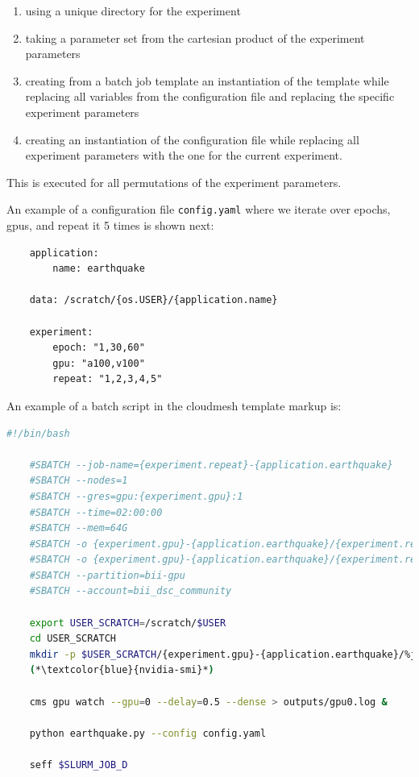\documentclass[utf8]{FrontiersinVancouver} %
\begin{document}
\begin{enumerate}
  \item using a unique directory for the experiment
  \item taking a parameter set from the cartesian product of the experiment parameters
  \item creating from a batch job template an instantiation of the template while replacing all variables from the configuration file    and replacing the specific experiment parameters
  \item creating an instantiation of the configuration file while replacing all experiment parameters with the one for the current experiment.
\end{enumerate}

This is executed for all permutations of the experiment parameters.

An example of a configuration file \verb|config.yaml| where we iterate over epochs, gpus, and repeat it 5 times is shown next:

\begin{lstlisting}
    application:
        name: earthquake

    data: /scratch/{os.USER}/{application.name}
       
    experiment:
        epoch: "1,30,60"
        gpu: "a100,v100"
        repeat: "1,2,3,4,5"
\end{lstlisting}

An example of a batch script in the cloudmesh template markup  is:

\begin{lstlisting}[language=sh]
    #!/bin/bash

    #SBATCH --job-name={experiment.repeat}-{application.earthquake}
    #SBATCH --nodes=1
    #SBATCH --gres=gpu:{experiment.gpu}:1
    #SBATCH --time=02:00:00
    #SBATCH --mem=64G
    #SBATCH -o {experiment.gpu}-{application.earthquake}/{experiment.repeat}-%j.out
    #SBATCH -o {experiment.gpu}-{application.earthquake}/{experiment.repeat}-%j.err
    #SBATCH --partition=bii-gpu
    #SBATCH --account=bii_dsc_community

    export USER_SCRATCH=/scratch/$USER
    cd USER_SCRATCH
    mkdir -p $USER_SCRATCH/{experiment.gpu}-{application.earthquake}/%j.out
    (*\textcolor{blue}{nvidia-smi}*)

    cms gpu watch --gpu=0 --delay=0.5 --dense > outputs/gpu0.log &

    python earthquake.py --config config.yaml

    seff $SLURM_JOB_D
\end{lstlisting}
\end{document}
